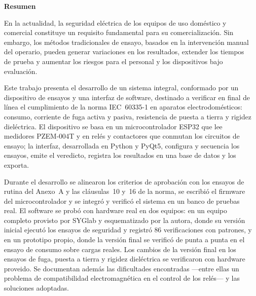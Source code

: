 \begin{center}
    \textbf{\huge Resumen}
\end{center}
\vspace{1cm}

En la actualidad, la seguridad eléctrica de los equipos de uso doméstico y
comercial constituye un requisito fundamental para su comercialización. Sin
embargo, los métodos tradicionales de ensayo, basados en la intervención manual
del operario, pueden generar variaciones en los resultados, extender los tiempos
de prueba y aumentar los riesgos para el personal y los dispositivos bajo
evaluación.

Este trabajo presenta el desarrollo de un sistema integral, conformado por un
dispositivo de ensayos y una interfaz de software, destinado a verificar en final
de línea el cumplimiento de la norma IEC~60335-1 en aparatos electrodomésticos:
consumo, corriente de fuga activa y pasiva, resistencia de puesta a tierra y
rigidez dieléctrica. El dispositivo se basa en un microcontrolador ESP32 que lee
medidores PZEM-004T y en relés y contactores que conmutan los circuitos de ensayo;
la interfaz, desarrollada en Python y PyQt5, configura y secuencia los ensayos,
emite el veredicto, registra los resultados en una base de datos y los exporta.

Durante el desarrollo se alinearon los criterios de aprobación con los ensayos de
rutina del Anexo~A y las cláusulas~10 y~16 de la norma, se escribió el firmware
del microcontrolador y se integró y verificó el sistema en un banco de pruebas
real. El software se probó con hardware real en dos equipos: en un equipo
completo provisto por SYGlab y esquematizado por la autora, donde su versión
inicial ejecutó los ensayos de seguridad y registró 86 verificaciones con
patrones, y en un prototipo propio, donde la versión final se verificó de punta a
punta en el ensayo de consumo sobre cargas reales. Los cambios de la versión
final en los ensayos de fuga, puesta a tierra y rigidez dieléctrica se
verificaron con hardware proveido. Se documentan además las
dificultades encontradas ---entre ellas un problema de compatibilidad
electromagnética en el control de los relés--- y las soluciones adoptadas.

\newpage
